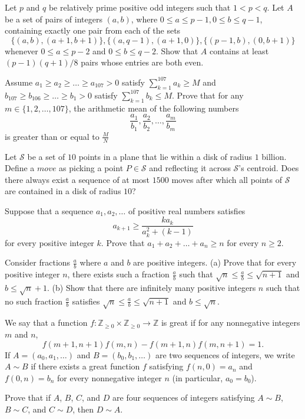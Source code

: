 \documentclass[11pt]{scrartcl}
\begin{document}
\begin{problem}[2599680620339408367]
Let $p$ and $q$ be relatively prime positive odd integers such that $1 < p < q$. Let $A$ be a set of pairs of integers $(a, b)$, where $0 \le a \le p - 1, 0 \le b \le q - 1$, containing exactly one pair from each of the sets$$\{(a, b),(a + 1, b + 1)\},  \{(a, q - 1), (a + 1, 0)\}, \{(p - 1,b),(0, b + 1)\}$$whenever $0 \le a \le p - 2$ and $0 \le b \le q - 2$. Show that $A$ contains at least $(p - 1)(q + 1)/8$ pairs whose entries are both even.
\end{problem}
\begin{problem}[2634774329278517059]
Assume $ a_{1} \ge a_{2} \ge \dots \ge a_{107} > 0 $ satisfy $ \sum\limits_{k=1}^{107}{a_{k}} \ge M $ and $ b_{107} \ge b_{106} \ge \dots \ge b_{1} > 0 $ satisfy $ \sum\limits_{k=1}^{107}{b_{k}} \le M $. Prove that for any $ m \in \{1,2, \dots, 107\} $, the arithmetic mean of the following numbers$$ \frac{a_{1}}{b_{1}}, \frac{a_{2}}{b_{2}}, \dots, \frac{a_{m}}{b_{m}} $$is greater than or equal to $ \frac{M}{N} $
\end{problem}
\begin{problem}[2649132917657979429]
Let $\mathcal{S}$ be a set of $10$ points in a plane that lie within a disk of radius $1$ billion. Define a $move$ as picking a point $P \in \mathcal{S}$ and reflecting it across $\mathcal{S}$'s centroid. Does there always exist a sequence of at most $1500$ moves after which all points of $\mathcal{S}$ are contained in a disk of radius $10$?
\end{problem}
\begin{problem}[2650659158441459375]
	Suppose that a sequence $a_1,a_2,\ldots$ of positive real numbers satisfies\[a_{k+1}\geq\frac{ka_k}{a_k^2+(k-1)}\]for every positive integer $k$. Prove that $a_1+a_2+\ldots+a_n\geq n$ for every $n\geq2$.
\end{problem}
\begin{problem}[2662630172971476475]
Consider fractions $\frac{a}{b}$ where $a$ and $b$ are positive integers.
(a) Prove that for every positive integer $n$, there exists such a fraction $\frac{a}{b}$ such that $\sqrt{n} \le \frac{a}{b} \le \sqrt{n+1}$ and $b \le \sqrt{n}+1$.
(b) Show that there are infinitely many positive integers $n$ such that no such fraction $\frac{a}{b}$ satisfies $\sqrt{n} \le \frac{a}{b} \le \sqrt{n+1}$ and $b \le \sqrt{n}$.
\end{problem}
\begin{problem}[2667130530962382147]
	We say that a function $f: \mathbb{Z}_{\ge 0} \times \mathbb{Z}_{\ge 0} \to \mathbb{Z}$ is great if for any nonnegative integers $m$ and $n$,
\[f(m + 1, n + 1) f(m, n) - f(m + 1, n) f(m, n + 1) = 1.\]If $A = (a_0, a_1, \dots)$ and $B = (b_0, b_1, \dots)$ are two sequences of integers, we write $A \sim B$ if there exists a great function $f$ satisfying $f(n, 0) = a_n$ and $f(0, n) = b_n$ for every nonnegative integer $n$ (in particular, $a_0 = b_0$).

Prove that if $A$, $B$, $C$, and $D$ are four sequences of integers satisfying $A \sim B$, $B \sim C$, and $C \sim D$, then $D \sim A$.
\end{problem}
\end{document}
